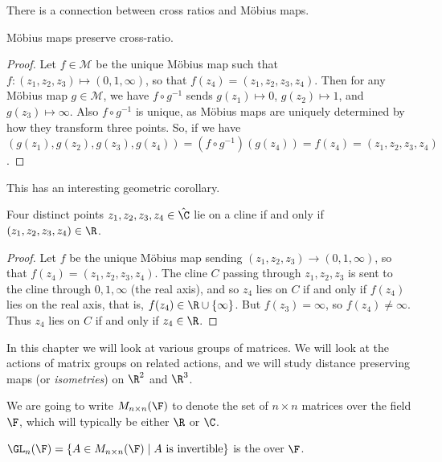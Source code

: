 There is a connection between cross ratios and Möbius maps.

\begin{theorem}
	Möbius maps preserve cross-ratio.
\end{theorem}
\begin{proof}
	Let $f \in \mathcal{M}$ be the unique Möbius map such that $f:(z_1, z_2, z_3) \mapsto (0, 1, \infty)$, so that $f(z_4) = (z_1, z_2, z_3, z_4)$. Then for any Möbius map $g \in \mathcal{M}$, we have $f \circ g^{-1}$ sends $g(z_1) \mapsto 0$, $g(z_2) \mapsto 1$, and $g(z_3) \mapsto \infty$. Also $f \circ g^{-1}$ is unique, as Möbius maps are uniquely determined by how they transform three points. So, if we have $(g(z_1), g(z_2), g(z_3), g(z_4)) = (f \circ g^{-1})(g(z_4)) = f(z_4) = (z_1, z_2, z_3, z_4)$.
\end{proof}

This has an interesting geometric corollary.

\begin{theorem}
	Four distinct points $z_1, z_2, z_3, z_4 \in \hat{\C}$ lie on a cline if and only if
	$(z_1, z_2, z_3, z_4) \in \R$.
\end{theorem}
\begin{proof}
	Let $f$ be the unique Möbius map sending $(z_1, z_2, z_3) \rightarrow (0, 1, \infty)$, so that $f(z_4) = (z_1, z_2, z_3, z_4)$. The cline $C$ passing through $z_1, z_2, z_3$ is sent to the cline through $0, 1, \infty$ (the real axis), and so $z_4$ lies on $C$ if and only if $f(z_4)$ lies on the real axis, that is, $f(z_4) \in \R \cup \{\infty\}$. But $f(z_3) = \infty$, so $f(z_4) \neq \infty$. Thus $z_4$ lies on $C$ if and only if $z_4 \in \R$. 
\end{proof}


In this chapter we will look at various groups of matrices. We will look at the actions of matrix groups on related actions, and we will study distance preserving maps (or \emph{isometries}) on $\R^2$ and $\R^3$.


We are going to write $M_{n \times n}(\F)$ to denote the set of $n \times n$ matrices over the field $\F$, which will typically be either $\R$ or $\C$.

\begin{definition}
	$\GL_n(\F) = \{A \in M_{n \times n}(\F) \mid A \text{ is invertible}\}$
 is the  over $\F$.
\end{definition}

